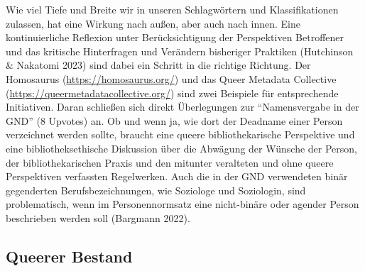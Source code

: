 \documentclass[a4paper,
fontsize=11pt,
oneside,
numbers=noperiodatend,
parskip=half-,
bibliography=totoc,
final
]{scrartcl}
\begin{document}
Wie viel Tiefe und Breite wir in unseren Schlagwörtern und
Klassifikationen zulassen, hat eine Wirkung nach außen, aber auch nach
innen. Eine kontinuierliche Reflexion unter Berücksichtigung der
Perspektiven Betroffener und das kritische Hinterfragen und Verändern
bisheriger Praktiken (Hutchinson \& Nakatomi 2023) sind dabei ein
Schritt in die richtige Richtung. Der Homosaurus
(\url{https://homosaurus.org/}) und das Queer Metadata Collective
(\url{https://queermetadatacollective.org/}) sind zwei Beispiele für
entsprechende Initiativen. Daran schließen sich direkt Überlegungen zur
\enquote{Namensvergabe in der GND} (8 Upvotes) an. Ob und wenn ja, wie
dort der Deadname einer Person verzeichnet werden sollte, braucht eine
queere bibliothekarische Perspektive und eine bibliotheksethische
Diskussion über die Abwägung der Wünsche der Person, der
bibliothekarischen Praxis und den mitunter veralteten und ohne queere
Perspektiven verfassten Regelwerken. Auch die in der GND verwendeten
binär gegenderten Berufsbezeichnungen, wie Soziologe und Soziologin,
sind problematisch, wenn im Personennormsatz eine nicht-binäre oder
agender Person beschrieben werden soll (Bargmann 2022).

\subsection{Queerer Bestand}\label{queerer-bestand}
\end{document}
